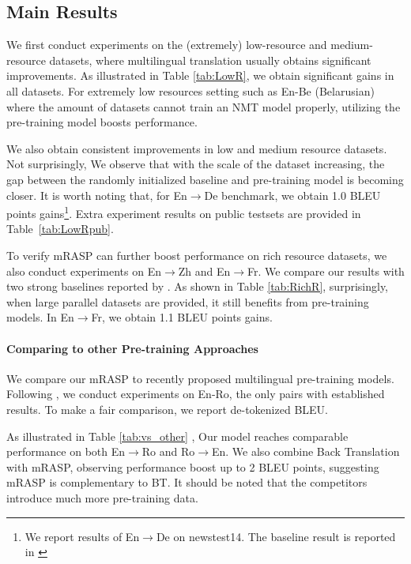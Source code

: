 \documentclass[11pt,a4paper]{article}
\newcommand{\method}{mRASP\xspace}
\begin{document}
\subsection{Main Results}

We first conduct experiments on the (extremely) low-resource and medium-resource datasets, where multilingual translation usually obtains significant improvements. As illustrated in Table \ref{tab:LowR}, we obtain significant gains in all datasets. 
For extremely low resources setting such as En-Be (Belarusian) where the amount of datasets cannot train an NMT model properly, utilizing the pre-training model boosts performance.

We also obtain consistent improvements in low and medium resource datasets. Not surprisingly, We observe that with the scale of the dataset increasing, the gap between the randomly initialized baseline and pre-training model is becoming closer. It is worth noting that, for En$\rightarrow$De benchmark, we obtain 1.0 BLEU points gains\footnote{We report results of En$\rightarrow$De on newstest14. The baseline result is reported in \citet{DBLP:conf/wmt/OttEGA18}}. Extra experiment results on public testsets are provided in Table~\ref{tab:LowRpub}.


To verify \method can further boost performance on rich resource datasets, we also conduct experiments on En$\rightarrow$Zh and En$\rightarrow$Fr. We compare our results with two strong baselines reported by \citet{DBLP:conf/wmt/OttEGA18, DBLP:conf/wmt/LiLXLLLWZXWFCLL19}. As shown in Table \ref{tab:RichR}, surprisingly, when large parallel datasets are provided, it still benefits from pre-training models. In En$\rightarrow$Fr, we obtain 1.1 BLEU points gains. 


\paragraph{Comparing to other Pre-training Approaches}
We compare our \method to recently proposed multilingual pre-training models. Following \citet{DBLP:journals/corr/abs-2001-08210}, we conduct experiments on En-Ro, the only pairs with established results. To make a fair comparison, we report de-tokenized BLEU.

As illustrated in Table \ref{tab:vs_other} , Our model reaches comparable performance on both En$\rightarrow$Ro and Ro$\rightarrow$En. We also combine Back Translation \cite{DBLP:conf/acl/SennrichHB16} with  \method, observing performance boost up to 2 BLEU points, suggesting \method is complementary to BT. It should be noted that the competitors introduce much more pre-training data.
\end{document}
